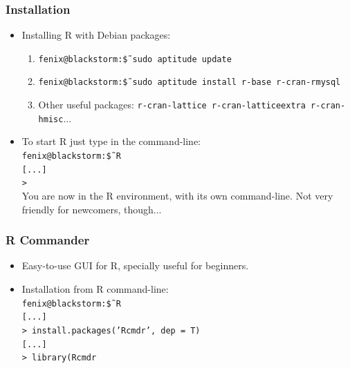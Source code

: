 \documentclass{beamer}
\begin{document}
\begin{frame}

\frametitle{Installation}
 \begin{itemize}
  \item Installing R with Debian packages:
  \begin{enumerate}
   \item \texttt{fenix@blackstorm:\~\$ sudo aptitude update}
   \item \texttt{fenix@blackstorm:\~\$ sudo aptitude install r-base r-cran-rmysql}
   \item Other useful packages: \texttt{r-cran-lattice r-cran-latticeextra r-cran-hmisc}...
  \end{enumerate}
   \item To start R just type in the command-line:\\
     \texttt{fenix@blackstorm:\~ \$ R}\\
     \texttt{[...]}\\
     \texttt{>}\\
    You are now in the R environment, with its own command-line. Not very
    friendly for newcomers, though...
 \end{itemize}

\end{frame}


\begin{frame}

\frametitle{R Commander}
  \begin{itemize}
   \item Easy-to-use GUI for R, specially useful for beginners.
   \item Installation from R command-line:\\
     \texttt{fenix@blackstorm:\~ \$ R}\\
     \texttt{[...]}\\
     \texttt{> install.packages('Rcmdr', dep = T)}\\
     \texttt{[...]}\\
     \texttt{> library(Rcmdr}\\
  \end{itemize}

\end{frame}

\end{document}
